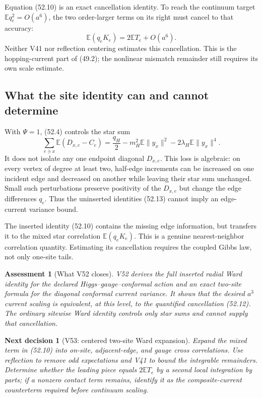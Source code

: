 \documentclass[11pt]{article}
\newtheorem{decision}[theorem]{Next decision}
\newtheorem{assessment}[theorem]{Assessment}
\theoremstyle{remark}
\begin{document}
Equation (52.10) is an exact cancellation identity.  To reach the
continuum target
\(\mathbb E q_e^2=O(a^6)\), the two order-larger terms on its right
must cancel to that accuracy:
\[
 \mathbb E(q_eK_e)
 =
 2\mathbb E T_e+O(a^6).                           \tag{52.12}
\]
Neither V41 nor reflection centering estimates this cancellation.  This is the hopping-current part of (49.2); the nonlinear mismatch remainder still requires its own scale estimate.

\subsection{What the site identity can and cannot determine}

With \(\Psi=1\), (52.4) controls the star sum
\[
 \sum_{e\ni x}\mathbb E(D_{x,e}-C_e)
 =
 \frac{q_H}{2}
 -m_H^2\mathbb E\|y_x\|^2
 -2\lambda_H\mathbb E\|y_x\|^4.                  \tag{52.13}
\]
It does not isolate any one endpoint diagonal \(D_{x,e}\).  This loss
is algebraic: on every vertex of degree at least two, half-edge
increments can be increased on one incident edge and decreased on
another while leaving their star sum unchanged.  Small such
perturbations preserve positivity of the \(D_{x,e}\) but change the
edge differences \(q_e\).  Thus the uninserted identities (52.13)
cannot imply an edge-current variance bound.

The inserted identity (52.10) contains the missing edge information,
but transfers it to the mixed star correlation
\(\mathbb E(q_eK_e)\).  This is a genuine nearest-neighbor correlation
quantity.  Estimating its cancellation requires the coupled Gibbs law,
not only one-site tails.

\begin{assessment}[What V52 closes]
\label{ass:v17v52-status}
V52 derives the full inserted radial Ward identity for the declared
Higgs--gauge--conformal action and an exact two-site formula for the
diagonal conformal current variance.  It shows that the desired
\(a^3\) current scaling is equivalent, at this level, to the
quantified cancellation (52.12).  The ordinary sitewise Ward identity
controls only star sums and cannot supply that cancellation.
\end{assessment}

\begin{decision}[V53: centered two-site Ward expansion]
\label{dec:v17v52-next}
Expand the mixed term in (52.10) into on-site, adjacent-edge, and gauge
cross correlations.  Use reflection to remove odd expectations and
V41 to bound the integrable remainders.  Determine whether the leading
piece equals \(2\mathbb ET_e\) by a second local integration by parts;
if a nonzero contact term remains, identify it as the composite-current
counterterm required before continuum scaling.
\end{decision}
\end{document}
